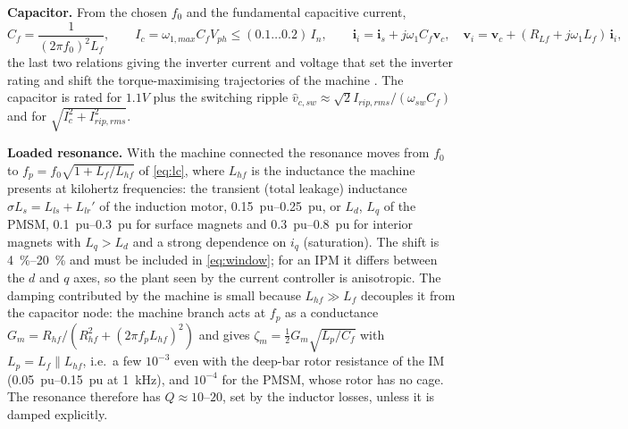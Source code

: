 \documentclass[10pt,a4paper]{scrartcl}
\newcommand{\wsw}{\omega_{sw}}
\newcommand{\Lhf}{L_{hf}}
\newcommand{\Rhf}{R_{hf}}
\newcommand{\Cf}{C_{f}}
\newcommand{\Lf}{L_{f}}
\begin{document}
\begin{onehalfspace}
\textbf{Capacitor.} From the chosen $f_0$ and the fundamental capacitive current,
\begin{equation}
\Cf = \frac{1}{(2\pi f_0)^2 \Lf},\qquad I_c = \omega_{1,max}\Cf V_{ph} \le (0.1 \ldots 0.2)\,I_n,\qquad
\boldsymbol i_i = \boldsymbol i_s + j\omega_1 \Cf \boldsymbol v_c,\quad \boldsymbol v_i = \boldsymbol v_c + (R_{Lf} + j\omega_1 \Lf)\,\boldsymbol i_i,
\label{eq:Cfm}
\end{equation}
the last two relations giving the inverter current and voltage that set the inverter rating and shift the torque-maximising trajectories of the machine \cite{salomaki2008}. The capacitor is rated for $1.1 V$ plus the switching ripple $\hat v_{c,sw} \approx \sqrt2 I_{rip,rms}/(\wsw\Cf)$ and for $\sqrt{I_c^2 + I_{rip,rms}^2}$.

\textbf{Loaded resonance.} With the machine connected the resonance moves from $f_0$ to $f_p = f_0\sqrt{1 + \Lf/\Lhf}$ of \eqref{eq:lc}, where $\Lhf$ is the inductance the machine presents at kilohertz frequencies: the transient (total leakage) inductance $\sigma L_s = L_{ls} + L_{lr}'$ of the induction motor, \SIrange{0.15}{0.25}{pu}, or $L_d$, $L_q$ of the PMSM, \SIrange{0.1}{0.3}{pu} for surface magnets and \SIrange{0.3}{0.8}{pu} for interior magnets with $L_q > L_d$ and a strong dependence on $i_q$ (saturation). The shift is \SIrange{4}{20}{\percent} and must be included in \eqref{eq:window}; for an IPM it differs between the $d$ and $q$ axes, so the plant seen by the current controller is anisotropic. The damping contributed by the machine is small because $\Lhf \gg \Lf$ decouples it from the capacitor node: the machine branch acts at $f_p$ as a conductance $G_m = \Rhf/(\Rhf^2 + (2\pi f_p \Lhf)^2)$ and gives $\zeta_m = \tfrac12 G_m\sqrt{L_p/\Cf}$ with $L_p = \Lf \parallel \Lhf$, i.e.\ a few $10^{-3}$ even with the deep-bar rotor resistance of the IM (\SIrange{0.05}{0.15}{pu} at \SI{1}{kHz}), and $10^{-4}$ for the PMSM, whose rotor has no cage. The resonance therefore has $Q \approx 10$--$20$, set by the inductor losses, unless it is damped explicitly.


\end{onehalfspace}
\end{document}
